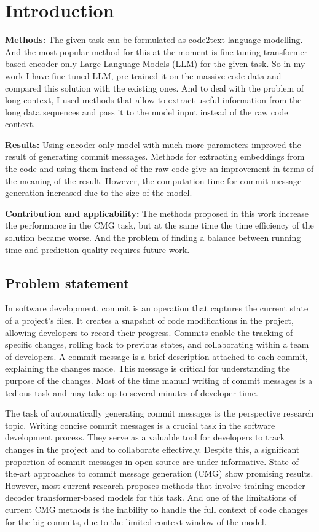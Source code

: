 \chapter{Introduction}\label{chap:intro}

\textbf{Methods:} The given task can be formulated as code2text language modelling. And the most popular method for this at the moment is fine-tuning transformer-based encoder-only Large Language Models (LLM) for the given task. So in my work I have fine-tuned LLM, pre-trained it on the massive code data and compared this solution with the existing ones. And to deal with the problem of long context, I used methods that allow to extract useful information from the long data sequences and pass it to the model input instead of the raw code context.

\textbf{Results:} Using encoder-only model with much more parameters improved the result of generating commit messages. Methods for extracting embeddings from the code and using them instead of the raw code give an improvement in terms of the meaning of the result. However, the computation time for commit message generation increased due to the size of the model.

\textbf{Contribution and applicability:} The methods proposed in this work increase the performance in the CMG task, but at the same time the time efficiency of the solution became worse. And the problem of finding a balance between running time and prediction quality requires future work.

\section{Problem statement}
In software development, commit is an operation that captures the current state of a project's files. It creates a snapshot of code modifications in the project, allowing developers to record their progress. Commits enable the tracking of specific changes, rolling back to previous states, and collaborating within a team of developers.
A commit message is a brief description attached to each commit, explaining the changes made. This message is critical for understanding the purpose of the changes. Most of the time manual writing of commit messages is a tedious task and may take up to several minutes of developer time. 

The task of automatically generating commit messages is the perspective research topic. Writing concise commit messages is a crucial task in the software development process. They serve as a valuable tool for developers to track changes in the project and to collaborate effectively. Despite this, a significant proportion of commit messages in open source are under-informative. State-of-the-art approaches to commit message generation (CMG) show promising results. However, most current research proposes methods that involve training encoder-decoder transformer-based models for this task. And one of the limitations of current CMG methods is the inability to handle the full context of code changes for the big commits, due to the limited context window of the model.


